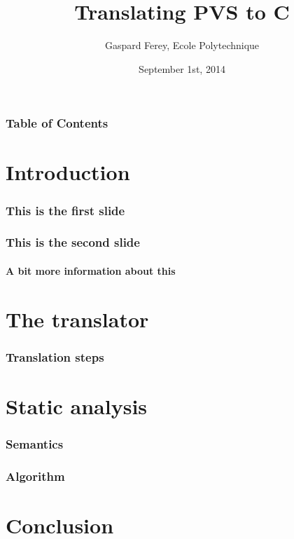 \documentclass{beamer}
\title[From PVS to C]{Translating PVS to C}
\author[Ferey]{Gaspard Ferey, Ecole Polytechnique}
\institute{SRI International}
\date{September 1st, 2014}
\begin{document}
\frame{\titlepage}


\begin{frame}
\frametitle{Table of Contents}
\tableofcontents[currentsection]
\end{frame}

\section{Introduction}

\begin{frame}
\frametitle{This is the first slide}

\end{frame}

\begin{frame}
\frametitle{This is the second slide}
\framesubtitle{A bit more information about this}

\end{frame}


\section{The translator}

\begin{frame}
\frametitle{Translation steps}

\end{frame}



\section{Static analysis}

\begin{frame}
\frametitle{Semantics}

\end{frame}

\begin{frame}
\frametitle{Algorithm}

\end{frame}

\begin{frame}
\frametitle{}

\end{frame}



\section{Conclusion}
\end{document}
